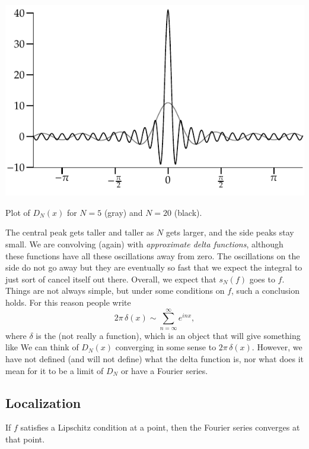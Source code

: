 \begin{myfigureht}
\includegraphics{figures/approxdeltas}
\caption{Plot of $D_N(x)$ for $N=5$ (gray) and $N=20$
(black).\label{fig:approxdeltas}}
\end{myfigureht}

The central peak gets taller and taller as $N$ gets larger,
and the side peaks stay small.
We are convolving (again) with
\emph{approximate delta functions},
although these functions have
all these oscillations away from zero.  The oscillations on the side do not go away
but they are eventually so fast that we expect the integral to just sort of
cancel itself out there.
Overall, we expect that
$s_N(f)$ goes to $f$.  Things are not always simple,
but under some conditions on $f$, such a conclusion holds.  For this reason
people write
\begin{equation*}
2\pi \, \delta(x) \sim \sum_{n=\infty}^\infty e^{inx} ,
\end{equation*}
where $\delta$ is the  (not really a function),
which is an object that will give something like
We can think of $D_N(x)$ converging in some sense to $2 \pi\, \delta(x)$.
However, we have not defined (and will not define) what the delta function
is, nor what does it mean for it to be a limit of $D_N$ or have a Fourier series.

\subsection{Localization}

If $f$ satisfies a Lipschitz condition at a point, then
the Fourier series converges at that point.

